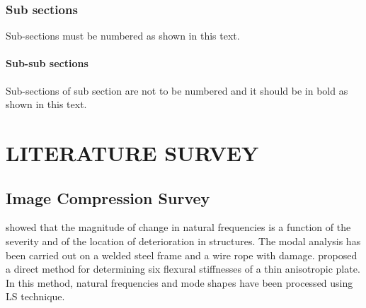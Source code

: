 \documentclass[BTech]{srmuthesis}
\begin{document}
  \subsection{Sub sections} 
  Sub-sections must be numbered as shown in this text. 
  \subsubsection{Sub-sub sections}
  Sub-sections of sub section are not to be numbered and it should be in bold as shown in this text. 
 \chapter{LITERATURE SURVEY}


\section{Image Compression Survey}
\citet{george} showed that the magnitude of change in natural frequencies is a function of the severity and of the location of deterioration in structures. The modal analysis has been carried out on a welded steel frame and a wire rope with damage. \citet{gredia} proposed a direct method for determining six flexural stiffnesses of a thin anisotropic plate. In this method, natural frequencies \citep{Leo} and mode shapes have been processed using \ac{LS} technique.
\end{document}
